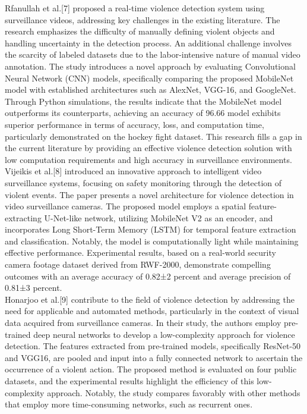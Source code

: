 \documentclass[conference]{IEEEtran}
\begin{document}
Rfanullah et al.[7] proposed a real-time violence detection system using surveillance videos, addressing key challenges in the existing literature. The research emphasizes the difficulty of manually defining violent objects and handling uncertainty in the detection process. An additional challenge involves the scarcity of labeled datasets due to the labor-intensive nature of manual video annotation. The study introduces a novel approach by evaluating Convolutional Neural Network (CNN) models, specifically comparing the proposed MobileNet model with established architectures such as AlexNet, VGG-16, and GoogleNet. Through Python simulations, the results indicate that the MobileNet model outperforms its counterparts, achieving an accuracy of 96.66%
model exhibits superior performance in terms of accuracy, loss, and computation time, particularly demonstrated on the hockey fight dataset. This research fills a gap in the current literature by providing an effective violence detection solution with low computation requirements and high accuracy in surveillance environments.
Vijeikis et al.[8] introduced an innovative approach to intelligent video surveillance systems, focusing on safety monitoring through the detection of violent events. The paper presents a novel architecture for violence detection in video surveillance cameras. The proposed model employs a spatial feature-extracting U-Net-like network, utilizing MobileNet V2 as an encoder, and incorporates Long Short-Term Memory (LSTM) for temporal feature extraction and classification. Notably, the model is computationally light while maintaining effective performance. Experimental results, based on a real-world security camera footage dataset derived from RWF-2000, demonstrate compelling outcomes with an average accuracy of 0.82±2 percent and average precision of 0.81±3 percent.\\

Honarjoo et al.[9] contribute to the field of violence detection by addressing the need for applicable and automated methods, particularly in the context of visual data acquired from surveillance cameras. In their study, the authors employ pre-trained deep neural networks to develop a low-complexity approach for violence detection. The features extracted from pre-trained models, specifically ResNet-50 and VGG16, are pooled and input into a fully connected network to ascertain the occurrence of a violent action. The proposed method is evaluated on four public datasets, and the experimental results highlight the efficiency of this low-complexity approach. Notably, the study compares favorably with other methods that employ more time-consuming networks, such as recurrent ones.
\end{document}

